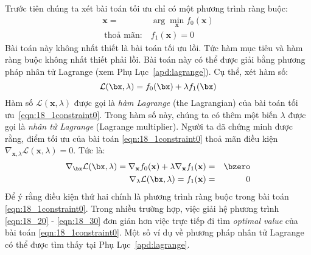 Trước tiên chúng ta xét bài toán tối ưu chỉ có một phương trình ràng buộc: 
\begin{equation} 
    \label{eqn:18_1constraint0}
    \begin{aligned}
    \mathbf{x}=& \arg\min_{\mathbf{x}} f_0(\mathbf{x}) \\\ 
    \text{thoả mãn:}~& f_1(\mathbf{x}) = 0
    \end{aligned}
\end{equation} 
Bài toán này không nhất thiết là bài toán tối ưu lồi. Tức hàm mục tiêu
và hàm ràng buộc không nhất thiết phải lồi. Bài toán này có thể được giải bằng
phương pháp nhân tử Lagrange (xem Phụ Lục~\ref{apd:lagrange}). Cụ thể, xét hàm
số:
\begin{equation}
    \label{eqn:simple_lagrange}
    \mathcal{L}(\bx, \lambda) = f_0(\bx) + \lambda f_1(\bx)
\end{equation}
 Hàm số
$\mathcal{L}(\mathbf{x}, \lambda)$ được gọi là \textit{hàm Lagrange}
(the Lagrangian) của bài toán tối ưu~\eqref{eqn:18_1constraint0}. Trong
hàm số này, chúng ta có thêm một biến  $\lambda$ được gọi là
\textit{nhân tử Lagrange} ({Lagrange multiplier}). Người ta đã chứng
minh được rằng, điểm tối ưu của bài toán
\eqref{eqn:18_1constraint0} thoả mãn điều kiện $\nabla_{\mathbf{x}, \lambda}
\mathcal{L}(\mathbf{x}, \lambda) = 0$. Tức là:
\begin{eqnarray} 
\label{eqn:18_20}
    \nabla_{\bx} \mathcal{L}(\bx, \lambda) = \nabla_{\mathbf{x}}f_0(\mathbf{x}) + \lambda \nabla_{\mathbf{x}} f_1(\mathbf{x}) &=& \bzero \\\ 
    \label{eqn:18_30}
    \nabla_{\lambda} \mathcal{L}(\bx, \lambda) = f_1(\mathbf{x}) & = & 0 
\end{eqnarray} 
Để ý rằng điều kiện thứ hai chính là phương trình ràng buộc trong bài toán
\eqref{eqn:18_1constraint0}.
Trong nhiều
trường hợp, việc giải hệ phương trình \eqref{eqn:18_20} - \eqref{eqn:18_30} đơn giản hơn việc trực tiếp đi tìm \textit{optimal value} của bài
toán \eqref{eqn:18_1constraint0}. Một số ví dụ về phương pháp nhân tử Lagrange
có thể được tìm thấy tại Phụ Lục~\ref{apd:lagrange}. 
 
 
